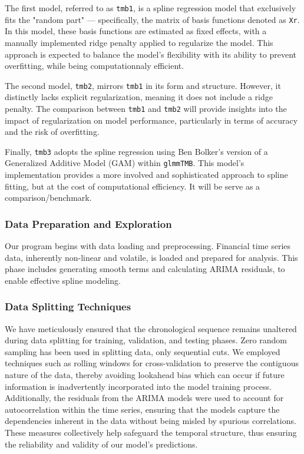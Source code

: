 \documentclass[12pt, twoside,hidelinks]{article}
\theoremstyle{definition}
\numberwithin{equation}{section}
\begin{document}
The first model, referred to as \texttt{tmb1}, is a spline regression model that exclusively fits the "random part" — specifically, the matrix of basis functions denoted as \texttt{Xr}. In this model, these basis functions are estimated as fixed effects, with a manually implemented ridge penalty applied to regularize the model. This approach is expected to balance the model's flexibility with its ability to prevent overfitting, while being computationnaly efficient.
\newline

The second model, \texttt{tmb2}, mirrors \texttt{tmb1} in its form and structure. However, it distinctly lacks explicit regularization, meaning it does not include a ridge penalty. The comparison between \texttt{tmb1} and \texttt{tmb2} will provide insights into the impact of regularization on model performance, particularly in terms of accuracy and the risk of overfitting.
\newline

Finally, \texttt{tmb3} adopts the spline regression using Ben Bolker's version of a Generalized Additive Model (GAM) within \texttt{glmmTMB}. This model's implementation provides a more involved and sophisticated approach to spline fitting, but at the cost of computational efficiency. It will be serve as a comparison/benchmark. 


\subsubsection*{Data Preparation and Exploration}
Our program begins with data loading and preprocessing. Financial time series data, inherently non-linear and volatile, is loaded and prepared for analysis. This phase includes generating smooth terms and calculating ARIMA residuals, to enable effective spline modeling. 
\newline

\subsubsection*{Data Splitting Techniques}
We have meticulously ensured that the chronological sequence remains unaltered during data splitting for training, validation, and testing phases. Zero random sampling has been used in splitting data, only sequential cuts. We employed techniques such as rolling windows for cross-validation to preserve the contiguous nature of the data, thereby avoiding lookahead bias which can occur if future information is inadvertently incorporated into the model training process. Additionally, the residuals from the ARIMA models were used to account for autocorrelation within the time series, ensuring that the models capture the dependencies inherent in the data without being misled by spurious correlations. These measures collectively help safeguard the temporal structure, thus ensuring the reliability and validity of our model's predictions.
\end{document}
